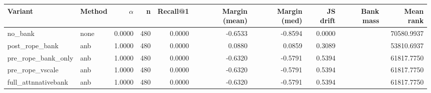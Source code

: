 \begin{tabular}{l l r r r r r r r r}
\toprule
Variant & Method & $\alpha$ & n & Recall@1 & Margin (mean) & Margin (med) & JS drift & Bank mass & Mean rank \\
\midrule
no\_bank & none & 0.0000 & 480 & 0.0000 & -0.6533 & -0.8594 & 0.0000 &  & 70580.9937 \\
post\_rope\_bank & anb & 1.0000 & 480 & 0.0000 & 0.0880 & 0.0859 & 0.3089 &  & 53810.6937 \\
pre\_rope\_bank\_only & anb & 1.0000 & 480 & 0.0000 & -0.6320 & -0.5791 & 0.5394 &  & 61817.7750 \\
pre\_rope\_vscale & anb & 1.0000 & 480 & 0.0000 & -0.6320 & -0.5791 & 0.5394 &  & 61817.7750 \\
full\_attnnativebank & anb & 1.0000 & 480 & 0.0000 & -0.6320 & -0.5791 & 0.5394 &  & 61817.7750 \\
\bottomrule
\end{tabular}
